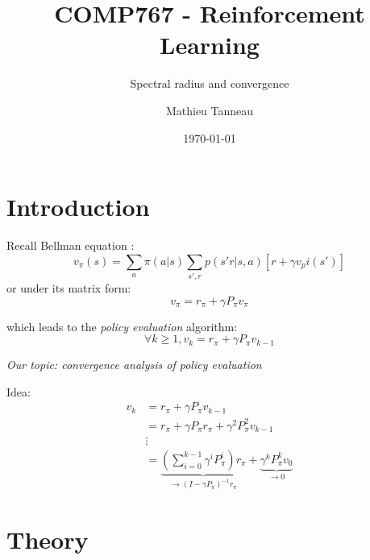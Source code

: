 \documentclass{beamer}
\title{COMP767 - Reinforcement Learning }
\subtitle{Spectral radius and convergence}
\author{Mathieu Tanneau}
\institute{École polytechnique de Montréal}
\date{\today}
\begin{document}
\begin{frame}
	\titlepage
\end{frame}

\section{Introduction}
	\begin{frame}
		Recall Bellman equation :
		\[
		v_{\pi}(s) = \sum_{a} \pi(a|s) \sum_{s',r}p(s'r|s,a)[r+\gamma v_pi(s')]
		\]
		or under its matrix form:
		\[
			v_{\pi} = r_{\pi} + \gamma P_{\pi} v_{\pi}		
		\]
	
		which leads to the \emph{policy evaluation} algorithm:
		\[
		\boxed{\ \ \ 
			\forall k\geq 1, v_{k} = r_{\pi} + \gamma P_{\pi} v_{k-1}
		\ \ \ }
		\]
		\begin{center}
		\emph{Our topic: convergence analysis of policy evaluation}
		\end{center}
		
	\end{frame}
	\begin{frame}
		Idea:
		\begin{align*}
		v_{k} &= r_{\pi} + \gamma P_{\pi} v_{k-1}\\
		&=r_{\pi} + \gamma P_{\pi} r_{\pi} + \gamma^{2} P_{\pi}^{2} v_{k-1}\\
		& \vdots \\
		&= \underbrace{\left(\sum_{i=0}^{k-1} \gamma^{i} P_{\pi}^{i}\right) r_{\pi}}_{\rightarrow (I-\gamma P_{\pi})^{-1}r_{\pi}}  + \underbrace{\gamma^{k} P_{\pi}^{k}v_{0}}_{\rightarrow 0}
		\end{align*}
	\end{frame}
\section{Theory}
\end{document}
